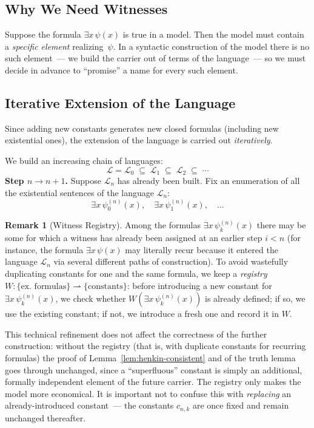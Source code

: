 \documentclass[12pt, a4paper]{article}
\theoremstyle{plain}
\theoremstyle{definition}
\newtheorem{remark}[theorem]{Remark}
\newcommand{\Lang}{\mathcal{L}}
\begin{document}
\subsection{Why We Need Witnesses}

Suppose the formula $\exists x\,\psi(x)$ is true in a model.
Then the model must contain a \emph{specific element}
realizing~$\psi$. In a syntactic construction of the model there is no such element~---
we build the carrier out of terms of the language~--- so we must
decide in advance to ``promise'' a name for every such element.

\subsection{Iterative Extension of the Language}

Since adding new constants generates new closed formulas
(including new existential ones), the extension of the language is carried out
\emph{iteratively}.

We build an increasing chain of languages:
\[
  \Lang = \Lang_0 \;\subseteq\; \Lang_1 \;\subseteq\; \Lang_2 \;\subseteq\; \cdots
\]
\textbf{Step $n \to n+1$.}
Suppose $\Lang_n$ has already been built. Fix an enumeration
of all the existential sentences of the language $\Lang_n$:
\[
  \exists x\,\psi_0^{(n)}(x),\quad \exists x\,\psi_1^{(n)}(x),\quad \ldots
\]

\begin{remark}[Witness Registry]\label{rem:registry}
Among the formulas $\exists x\,\psi_k^{(n)}(x)$ there may be some for which a
witness has already been assigned at an earlier step $i < n$ (for instance,
the formula $\exists x\,\psi(x)$ may literally recur because it entered the language
$\Lang_n$ via several different paths of construction). To avoid
wastefully duplicating constants for one and the same formula, we keep
a \emph{registry} $W \colon \{\text{ex.\ formulas}\} \rightharpoonup \{\text{constants}\}$:
before introducing a new constant for $\exists x\,\psi_k^{(n)}(x)$, we check
whether $W(\exists x\,\psi_k^{(n)}(x))$ is already defined; if so, we use the
existing constant; if not, we introduce a fresh one and record it in $W$.

This technical refinement does not affect the correctness of the further construction:
without the registry (that is, with duplicate constants for recurring formulas)
the proof of Lemma~\ref{lem:henkin-consistent} and of the truth lemma
goes through unchanged, since a ``superfluous'' constant is simply an
additional, formally independent element of the future carrier.
The registry only makes the model more economical. It is important not to confuse this with
\emph{replacing} an already-introduced constant~--- the constants $c_{n,k}$ are once
fixed and remain unchanged thereafter.
\end{remark}
\end{document}
